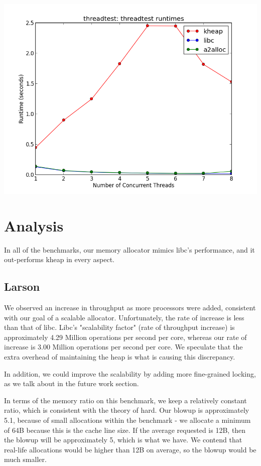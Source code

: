 \documentclass[a4paper, 12pt]{article}
\begin{document}
\vfill
\begin{center}
	\includegraphics[width=6.0 in]{threadtest.png}
\end{center}
\vfill

\section{Analysis}
In all of the benchmarks, our memory allocator mimics libc's performance, and it out-performs kheap in every aspect.

\subsection{Larson}
We observed an increase in throughput as more processors were added, consistent with our goal of a scalable allocator. Unfortunately, the rate of increase is less than that of libc. Libc's "scalability factor" (rate of throughput increase) is approximately 4.29 Million operations per second per core, whereas our rate of increase is 3.00 Million operations per second per core. We speculate that the extra overhead of maintaining the heap is what is causing this discrepancy.

In addition, we could improve the scalability by adding more fine-grained locking, as we talk about in the future work section.

In terms of the memory ratio on this benchmark, we keep a relatively constant ratio, which is consistent with the theory of hard. Our blowup is approximately 5.1, because of small allocations within the benchmark - we allocate a minimum of 64B because this is the cache line size. If the average requested is 12B, then the blowup will be approximately 5, which is what we have. We contend that real-life allocations would be higher than 12B on average, so the blowup would be much smaller.
\end{document}
